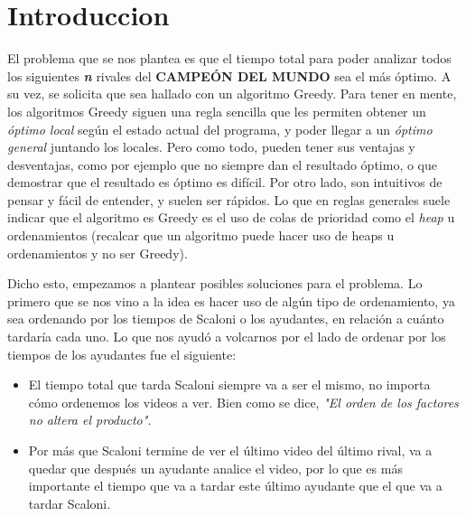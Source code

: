 \section{Introduccion}

El problema que se nos plantea es que el tiempo total para poder analizar todos los siguientes \textbf{\textit {n}} rivales del \textbf{CAMPEÓN DEL MUNDO} sea el más óptimo. A su vez, se solicita que sea hallado con un algoritmo Greedy. Para tener en mente, los algoritmos Greedy siguen una regla sencilla que les permiten obtener un \textit{óptimo local} según el estado actual del programa, y poder llegar a un \textit{óptimo general} juntando los locales. Pero como todo, pueden tener sus ventajas y desventajas, como por ejemplo que no siempre dan el resultado óptimo, o que demostrar que el resultado es óptimo es difícil. Por otro lado, son intuitivos de pensar y fácil de entender, y suelen ser rápidos. Lo que en reglas generales suele indicar que el algoritmo es Greedy es el uso de colas de prioridad como el \textit{heap} u ordenamientos (recalcar que un algoritmo puede hacer uso de heaps u ordenamientos y no ser Greedy).

Dicho esto, empezamos a plantear posibles soluciones para el problema. Lo primero que se nos vino a la idea es hacer uso de algún tipo de ordenamiento, ya sea ordenando por los tiempos de Scaloni o los ayudantes, en relación a cuánto tardaría cada uno. Lo que nos ayudó a volcarnos por el lado de ordenar por los tiempos de los ayudantes fue el siguiente:
\begin{itemize}
	\item El tiempo total que tarda Scaloni siempre va a ser el mismo, no importa cómo ordenemos los videos a ver. Bien como se dice, \textit{"El orden de los factores no altera el producto"}.
	\item Por más que Scaloni termine de ver el último video del último rival, va a quedar que después un ayudante analice el video, por lo que es más importante el tiempo que va a tardar este último ayudante que el que va a tardar Scaloni.
\end{itemize}

